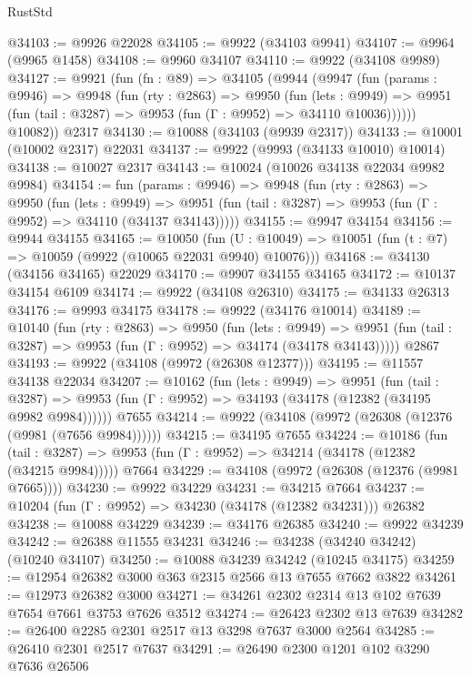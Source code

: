 \begin{lexlean}{RustStd}
\begin{coremodule}
@34103 := @9926 @22028
@34105 := @9922 (@34103 @9941)
@34107 := @9964 (@9965 @1458)
@34108 := @9960 @34107
@34110 := @9922 (@34108 @9989)
@34127 := @9921
    (fun (fn : @89) =>
    @34105
      (@9944
        (@9947
          (fun (params : @9946) =>
          @9948
            (fun (rty : @2863) =>
            @9950
              (fun (lets : @9949) =>
              @9951 (fun (tail : @3287) => @9953 (fun (Γ : @9952) => @34110 @10036))))))
        @10082))
    @2317
@34130 := @10088 (@34103 (@9939 @2317))
@34133 := @10001 (@10002 @2317) @22031
@34137 := @9922 (@9993 (@34133 @10010) @10014)
@34138 := @10027 @2317
@34143 := @10024 (@10026 @34138 @22034 @9982 @9984)
@34154 := fun (params : @9946) =>
  @9948
    (fun (rty : @2863) =>
    @9950
      (fun (lets : @9949) =>
      @9951 (fun (tail : @3287) => @9953 (fun (Γ : @9952) => @34110 (@34137 @34143)))))
@34155 := @9947 @34154
@34156 := @9944 @34155
@34165 := @10050
    (fun (U : @10049) => @10051 (fun (t : @7) => @10059 (@9922 (@10065 @22031 @9940) @10076)))
@34168 := @34130 (@34156 @34165) @22029
@34170 := @9907 @34155 @34165
@34172 := @10137 @34154 @6109
@34174 := @9922 (@34108 @26310)
@34175 := @34133 @26313
@34176 := @9993 @34175
@34178 := @9922 (@34176 @10014)
@34189 := @10140
    (fun (rty : @2863) =>
    @9950
      (fun (lets : @9949) =>
      @9951 (fun (tail : @3287) => @9953 (fun (Γ : @9952) => @34174 (@34178 @34143)))))
    @2867
@34193 := @9922 (@34108 (@9972 (@26308 @12377)))
@34195 := @11557 @34138 @22034
@34207 := @10162
    (fun (lets : @9949) =>
    @9951
      (fun (tail : @3287) =>
      @9953 (fun (Γ : @9952) => @34193 (@34178 (@12382 (@34195 @9982 @9984))))))
    @7655
@34214 := @9922 (@34108 (@9972 (@26308 (@12376 (@9981 (@7656 @9984))))))
@34215 := @34195 @7655
@34224 := @10186
    (fun (tail : @3287) => @9953 (fun (Γ : @9952) => @34214 (@34178 (@12382 (@34215 @9984)))))
    @7664
@34229 := @34108 (@9972 (@26308 (@12376 (@9981 @7665))))
@34230 := @9922 @34229
@34231 := @34215 @7664
@34237 := @10204 (fun (Γ : @9952) => @34230 (@34178 (@12382 @34231))) @26382
@34238 := @10088 @34229
@34239 := @34176 @26385
@34240 := @9922 @34239
@34242 := @26388 @11555 @34231
@34246 := @34238 (@34240 @34242) (@10240 @34107)
@34250 := @10088 @34239 @34242 (@10245 @34175)
@34259 := @12954 @26382 @3000 @363 @2315 @2566 @13 @7655 @7662 @3822
@34261 := @12973 @26382 @3000
@34271 := @34261 @2302 @2314 @13 @102 @7639 @7654 @7661 @3753 @7626 @3512
@34274 := @26423 @2302 @13 @7639
@34282 := @26400 @2285 @2301 @2517 @13 @3298 @7637 @3000 @2564
@34285 := @26410 @2301 @2517 @7637
@34291 := @26490 @2300 @1201 @102 @3290 @7636 @26506

\end{coremodule}
\end{lexlean}
